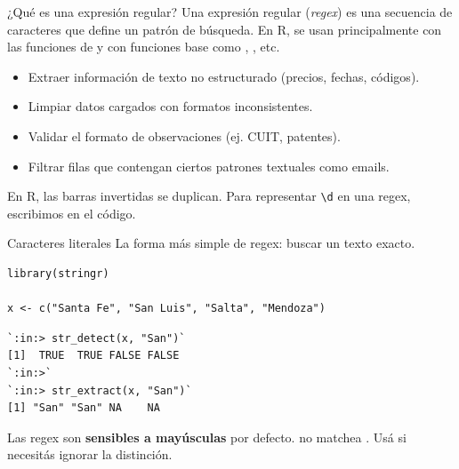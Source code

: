 \documentclass[8pt]{beamer}
\begin{document}
	\subtitle{Cheatsheet de expresiones regulares}

	\begin{frame}[plain]
		\maketitle
	\end{frame}



\begin{frame}[fragile]{¿Qué es una expresión regular?}
	Una expresión regular (\emph{regex}) es una secuencia de caracteres que define un patrón de búsqueda. En R, se usan principalmente con las funciones de  y con funciones base como , , etc.
	
	\begin{itemize}
		\item Extraer información de texto no estructurado (precios, fechas, códigos).
		\item Limpiar datos cargados con formatos inconsistentes.
		\item Validar el formato de observaciones (ej. CUIT, patentes).
		\item Filtrar filas que contengan ciertos patrones textuales como emails.
	\end{itemize}

	\begin{alertblock}{}
		En R, las barras invertidas se duplican. Para representar \texttt{\textbackslash d} en una regex, escribimos  en el código.
	\end{alertblock}
\end{frame}




\begin{frame}[fragile]{Caracteres literales}
	La forma más simple de regex: buscar un texto exacto.
\begin{lstlisting}[style=RScript]
library(stringr)

x <- c("Santa Fe", "San Luis", "Salta", "Mendoza")
\end{lstlisting}
\begin{lstlisting}[style=RConsole]
`:in:> str_detect(x, "San")`
[1]  TRUE  TRUE FALSE FALSE
`:in:>`
`:in:> str_extract(x, "San")`
[1] "San" "San" NA    NA
\end{lstlisting}

	\begin{alertblock}{}
		Las regex son \textbf{sensibles a mayúsculas} por defecto.  no matchea . Usá  si necesitás ignorar la distinci\'on.
	\end{alertblock}
\end{frame}
\end{document}
